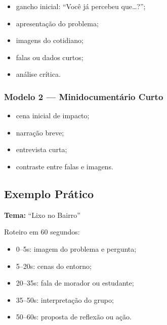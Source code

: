 \documentclass[
  letterpaper,
  DIV=11,
  numbers=noendperiod]{scrreport}
\providecommand{\tightlist}{%
  \setlength{\itemsep}{0pt}\setlength{\parskip}{0pt}}
\begin{document}
\begin{itemize}
\tightlist
\item
  gancho inicial: ``Você já percebeu que\ldots?'';
\item
  apresentação do problema;
\item
  imagens do cotidiano;
\item
  falas ou dados curtos;
\item
  análise crítica.
\end{itemize}

\subsubsection{Modelo 2 --- Minidocumentário
Curto}\label{modelo-2-minidocumentuxe1rio-curto}

\begin{itemize}
\tightlist
\item
  cena inicial de impacto;
\item
  narração breve;
\item
  entrevista curta;
\item
  contraste entre falas e imagens.
\end{itemize}

\subsection{Exemplo Prático}\label{exemplo-pruxe1tico}

\textbf{Tema:} ``Lixo no Bairro''

Roteiro em 60 segundos:

\begin{itemize}
\tightlist
\item
  0--5s: imagem do problema e pergunta;
\item
  5--20s: cenas do entorno;
\item
  20--35s: fala de morador ou estudante;
\item
  35--50s: interpretação do grupo;
\item
  50--60s: proposta de reflexão ou ação.
\end{itemize}
\end{document}
